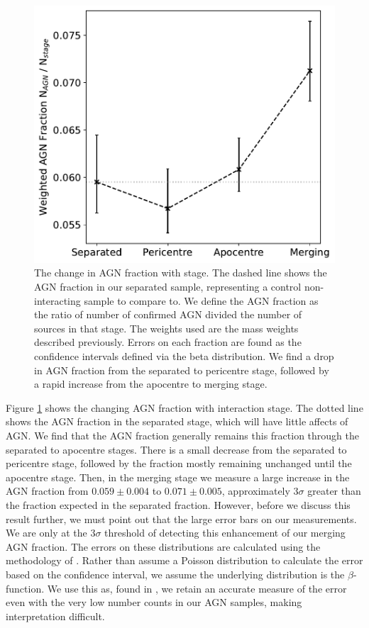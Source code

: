 \begin{figure}
\centering
\includegraphics[width=\textwidth]{Chapter3/figures/new-agn-fraction-stage.pdf}
\caption[The change in AGN fraction with stage.]{The change in AGN fraction with stage. The dashed line shows the AGN fraction in our separated sample, representing a control non-interacting sample to compare to. We define the AGN fraction as the ratio of number of confirmed AGN divided the number of sources in that stage. The weights used are the mass weights described previously. Errors on each fraction are found as the confidence intervals defined via the beta distribution. We find a drop in AGN fraction from the separated to pericentre stage, followed by a rapid increase from the apocentre to merging stage.}
\label{fig:agn-frac-time}
\end{figure}

Figure \ref{fig:agn-frac-time} shows the changing AGN fraction with interaction stage. The dotted line shows the AGN fraction in the separated stage, which will have little affects of AGN. We find that the AGN fraction generally remains this fraction through the separated to apocentre stages. There is a small decrease from the separated to pericentre stage, followed by the fraction mostly remaining unchanged until the apocentre stage. Then, in the merging stage we measure a large increase in the AGN fraction from $0.059\pm0.004$ to $0.071\pm0.005$, approximately $3\sigma$ greater than the fraction expected in the separated fraction. However, before we discuss this result further, we must point out that the large error bars on our measurements. We are only at the $3\sigma$ threshold of detecting this enhancement of our merging AGN fraction. The errors on these distributions are calculated using the methodology of \citet{2011PASA...28..128C}. Rather than assume a Poisson distribution to calculate the error based on the confidence interval, we assume the underlying distribution is the $\beta$-function. We use this as, found in \citet{2011PASA...28..128C}, we retain an accurate measure of the error even with the very low number counts in our AGN samples, making interpretation difficult.

